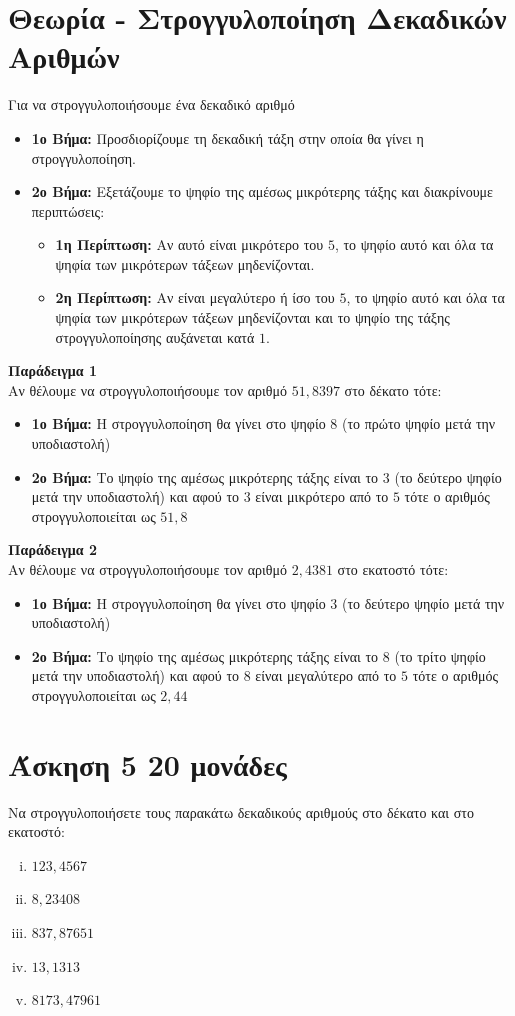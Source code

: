 \documentclass[a4paper,10pt]{report}
\begin{document}
\section*{Θεωρία - Στρογγυλοποίηση Δεκαδικών Αριθμών\hfill \small{}}
Για να στρογγυλοποιήσουμε ένα δεκαδικό αριθμό
\begin{itemize}
 \item \textbf{1ο Βήμα:} Προσδιορίζουμε τη δεκαδική τάξη στην οποία θα γίνει η στρογγυλοποίηση.
 \item \textbf{2ο Βήμα:} Εξετάζουμε το ψηφίο της αμέσως μικρότερης τάξης και διακρίνουμε περιπτώσεις: 
        \begin{itemize}
         \item \textbf{1η Περίπτωση:} Αν αυτό είναι μικρότερο του $5$, το ψηφίο αυτό και όλα τα ψηφία 
                των μικρότερων τάξεων μηδενίζονται.
         \item \textbf{2η Περίπτωση:} Αν είναι μεγαλύτερο ή ίσο του $5$, το ψηφίο αυτό και όλα τα ψηφία 
                των μικρότερων τάξεων μηδενίζονται και το ψηφίο της τάξης στρογγυλοποίησης αυξάνεται κατά $1$.
        \end{itemize}
\end{itemize}

\textbf{Παράδειγμα 1}\\
Αν θέλουμε να στρογγυλοποιήσουμε τον αριθμό $51,8397$ στο δέκατο τότε:
\begin{itemize}
 \item \textbf{1ο Βήμα:} Η στρογγυλοποίηση θα γίνει στο ψηφίο $8$ (το πρώτο ψηφίο μετά την υποδιαστολή)
 \item \textbf{2ο Βήμα:} Το ψηφίο της αμέσως μικρότερης τάξης είναι το $3$ (το δεύτερο ψηφίο μετά την υποδιαστολή) 
       και αφού το $3$ είναι μικρότερο από το $5$ τότε ο αριθμός στρογγυλοποιείται ως $51,8$
\end{itemize}

\textbf{Παράδειγμα 2}\\
Αν θέλουμε να στρογγυλοποιήσουμε τον αριθμό $2,4381$ στο εκατοστό τότε:
\begin{itemize}
 \item \textbf{1ο Βήμα:} Η στρογγυλοποίηση θα γίνει στο ψηφίο $3$ (το δεύτερο ψηφίο μετά την υποδιαστολή)
 \item \textbf{2ο Βήμα:} Το ψηφίο της αμέσως μικρότερης τάξης είναι το $8$ (το τρίτο ψηφίο μετά την υποδιαστολή) 
       και αφού το $8$ είναι μεγαλύτερο από το $5$ τότε ο αριθμός στρογγυλοποιείται ως $2,44$
\end{itemize}


\section*{Άσκηση 5  \hfill \small{20 μονάδες}}
Να στρογγυλοποιήσετε τους παρακάτω δεκαδικούς αριθμούς στο δέκατο και στο εκατοστό:
\begin{enumerate}[i)]
 \item $123,4567$
 \item $8,23408$
 \item $837,87651$
 \item $13,1313$
 \item $8173,47961$
\end{enumerate}
\end{document}
